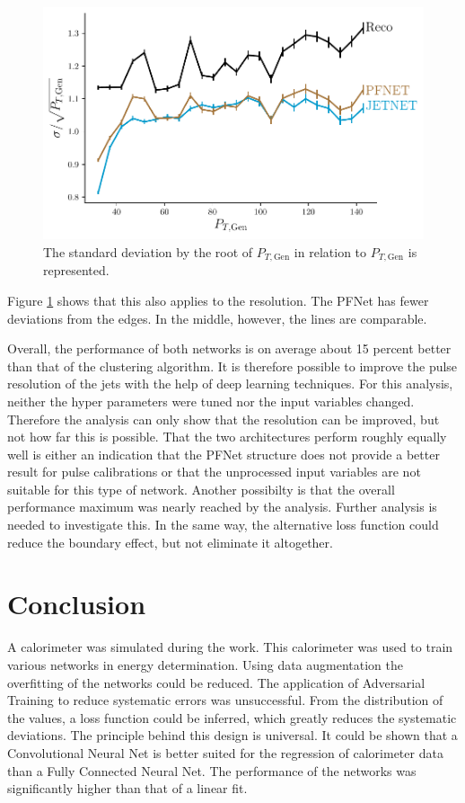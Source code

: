 \documentclass[12pt, a4paper]{thesis}
\begin{document}
\begin{figure}[H]
  \centering
  \includegraphics[width=.9\linewidth]{../images/comp_res.pdf}
  \caption{The standard deviation by the root of \(P_{T, \text{Gen}}\)
    in relation to \(P_{T, \text{Gen}}\) is represented.}
  \label{comp_res}
\end{figure}

Figure \ref{comp_res} shows that this also applies to the
resolution. The PFNet has fewer deviations from the edges. In the
middle, however, the lines are comparable.

Overall, the performance of both networks is on average about 15
percent better than that of the clustering algorithm.  It is therefore
possible to improve the pulse resolution of the jets with the help of
deep learning techniques.  For this analysis, neither the hyper
parameters were tuned nor the input variables changed. Therefore the
analysis can only show that the resolution can be improved, but not
how far this is possible. That the two architectures perform roughly
equally well is either an indication that the PFNet structure does not
provide a better result for pulse calibrations or that the unprocessed
input variables are not suitable for this type of network. Another
possibilty is that the overall performance maximum was nearly reached
by the analysis. Further analysis is needed to investigate this.  In
the same way, the alternative loss function could reduce the boundary
effect, but not eliminate it altogether.

\chapter{Conclusion}
\label{sec:org62a45ca}

A calorimeter was simulated during the work. This calorimeter was used
to  train  various  networks   in  energy  determination.  Using  data
augmentation the  overfitting of  the networks  could be  reduced. The
application of  Adversarial Training  to reduce systematic  errors was
unsuccessful.  From  the distribution of  the values, a  loss function
could   be   inferred,   which    greatly   reduces   the   systematic
deviations. The principle behind this design is universal. It could be
shown  that  a Convolutional  Neural  Net  is  better suited  for  the
regression of calorimeter data than  a Fully Connected Neural Net. The
performance of  the networks was  significantly higher than that  of a
linear fit.
\end{document}
